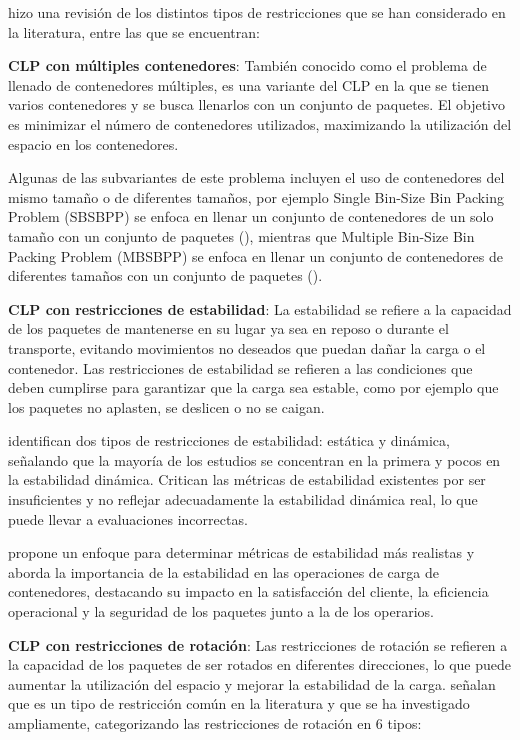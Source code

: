 \textcite{Bortfeldt20131} hizo una revisión de los distintos tipos de restricciones que se han considerado en la literatura, entre las que se encuentran:

\textbf{CLP con múltiples contenedores}: También conocido como el problema de llenado de contenedores múltiples, es una variante del CLP en la que se tienen varios contenedores y se busca llenarlos con un conjunto de paquetes. El objetivo es minimizar el número de contenedores utilizados, maximizando la utilización del espacio en los contenedores.

Algunas de las subvariantes de este problema incluyen el uso de contenedores del mismo tamaño o de diferentes tamaños, por ejemplo Single Bin-Size Bin Packing Problem (SBSBPP) se enfoca en llenar un conjunto de contenedores de un solo tamaño con un conjunto de paquetes (\textcite{ren2011priority}), mientras que Multiple Bin-Size Bin Packing Problem (MBSBPP) se enfoca en llenar un conjunto de contenedores de diferentes tamaños con un conjunto de paquetes (\textcite{zhao2016comparative}).

\textbf{CLP con restricciones de estabilidad}: La estabilidad se refiere a la capacidad de los paquetes de mantenerse en su lugar ya sea en reposo o durante el transporte, evitando movimientos no deseados que puedan dañar la carga o el contenedor. Las restricciones de estabilidad se refieren a las condiciones que deben cumplirse para garantizar que la carga sea estable, como por ejemplo que los paquetes no aplasten, se deslicen o no se caigan.

\textcite{Bortfeldt20131} identifican dos tipos de restricciones de estabilidad: estática y dinámica, señalando que la mayoría de los estudios se concentran en la primera y pocos en la estabilidad dinámica. Critican las métricas de estabilidad existentes por ser insuficientes y no reflejar adecuadamente la estabilidad dinámica real, lo que puede llevar a evaluaciones incorrectas.

\textcite{RAMOS2015480} propone un enfoque para determinar métricas de estabilidad más realistas y aborda la importancia de la estabilidad en las operaciones de carga de contenedores, destacando su impacto en la satisfacción del cliente, la eficiencia operacional y la seguridad de los paquetes junto a la de los operarios.


\textbf{CLP con restricciones de rotación}: Las restricciones de rotación se refieren a la capacidad de los paquetes de ser rotados en diferentes direcciones, lo que puede aumentar la utilización del espacio y mejorar la estabilidad de la carga. \textcite{Bortfeldt20131} señalan que es un tipo de restricción común en la literatura y que se ha investigado ampliamente, categorizando las restricciones de rotación en 6 tipos:

